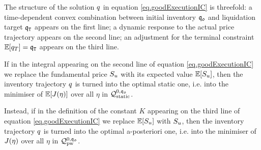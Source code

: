 \documentclass[10pt,a4paper]{article}
\begin{document}
\begin{remark}\label{remark.turnGoodExecutionIntoStaticAndIntoAposteriori}
The structure of the solution $q$ in equation \eqref{eq.goodExecutionIC} is threefold: a time-dependent convex combination between initial inventory $\mathfrak{q_0}$ and liquidation target $\mathfrak{q}_{\mathtt{T} }$ appears on the first line; a dynamic response to the actual price trajectory appears on the second line; an adjustment for the terminal constraint $\mathbb{{E}}[q_T]  = \mathfrak{q}_{\mathtt{T} }$ appears on the third line. 

If in the integral appearing on the second line of equation  \eqref{eq.goodExecutionIC} we replace the fundamental price $S_u$ with its expected value $\mathbb{{E}}[S_u]$, then  the inventory trajectory $q$ is turned into the optimal static one, i.e. into the minimiser of $\mathbb{{E}} [J(\eta)]$ over all $\eta$ in $\mathcal{Q}_{\text{static}}^{0,\mathfrak{q_0}}$.

Instead, if in the definition of the constant  $K$ appearing on  the third line of equation  \eqref{eq.goodExecutionIC} we replace $\mathbb{{E}}[S_u]$ with $S_u$, then the inventory trajectory $q$ is turned into the optimal a-posteriori one, i.e. into the minimiser of $J(\eta)$ over all $\eta$ in $\mathcal{Q}_{\text{pw}}^{0,\mathfrak{q_0}}$. 
\end{remark}
\end{document}

